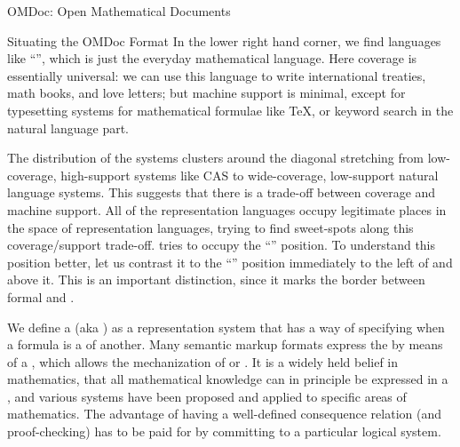 \begin{tchapter}[id=omdoc-markup,short=Open Mathematical Documents]{OMDoc: Open Mathematical Documents}
\begin{tsection}[id=situating]{Situating the OMDoc Format}
In the lower right hand corner, we find languages like
``{}'', which is just the everyday mathematical
language. Here coverage is essentially universal: we can use this language to write
international treaties, math books, and love letters; but machine support is minimal,
except for typesetting systems for mathematical formulae like {\TeX}, or keyword search in
the natural language part.

The distribution of the systems clusters around the diagonal stretching from low-coverage,
high-support systems like CAS to wide-coverage, low-support natural language systems. This
suggests that there is a trade-off between coverage and machine support. All of the
representation languages occupy legitimate places in the space of representation
languages, trying to find sweet-spots along this coverage/support trade-off. {\omdoc}
tries to occupy the ``{}'' position. To understand this position
better, let us contrast it to the ``{}'' position immediately to
the left of and above it. This is an important distinction, since it marks the border
between formal and {}.

We define a {} (aka {}) as a
representation system that has a way of specifying when a formula is a
{} of another. Many semantic markup formats express the
{} by means of a {}, which allows
the mechanization of {} or {}. It is
a widely held belief in mathematics, that all mathematical knowledge can in principle be
expressed in a {}, and various systems have been proposed and
applied to specific areas of mathematics. The advantage of having a well-defined
consequence relation (and proof-checking) has to be paid for by committing to a particular
logical system.


\end{tsection}
\end{tchapter}
